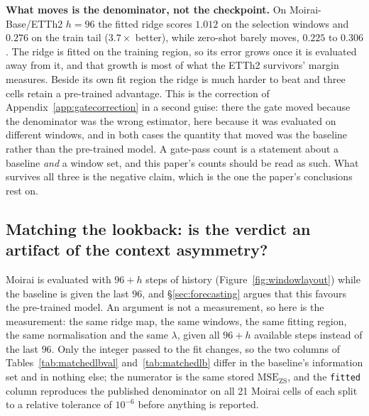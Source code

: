 \textbf{What moves is the denominator, not the checkpoint.}  On
Moirai-Base/ETTh2 $h{=}96$ the fitted ridge scores $1.012$ on the selection windows
and $0.276$ on the train tail ($3.7\times$ better), while zero-shot barely moves,
$0.225$ to $0.306$.  The ridge is fitted on the training region, so its error grows
once it is evaluated away from it, and that growth is most of what the ETTh2
survivors' margin measures.  Beside its own fit region the ridge is much harder to
beat and three cells retain a pre-trained advantage.  This is the correction of
Appendix~\ref{app:gatecorrection} in a second guise: there the gate moved because the
denominator was the wrong estimator, here because it was evaluated on different
windows, and in both cases the quantity that moved was the baseline rather than the
pre-trained model.  A gate-pass count is a statement about a baseline \emph{and} a
window set, and this paper's counts should be read as such.  What survives all three
is the negative claim, which is the one the paper's conclusions rest on.

\subsection{Matching the lookback: is the verdict an artifact of the context asymmetry?}
\label{app:baselines:matchedlb}

Moirai is evaluated with $96{+}h$ steps of history (Figure~\ref{fig:windowlayout})
while the baseline is given the last $96$, and \S\ref{sec:forecasting} argues that
this favours the pre-trained model.  An argument is not a measurement, so here is
the measurement: the same ridge map, the same windows, the same fitting region,
the same normalisation and the same $\lambda$, given all $96{+}h$ available steps
instead of the last $96$.  Only the integer passed to the fit changes, so the two
columns of Tables~\ref{tab:matchedlbval} and~\ref{tab:matchedlb} differ in the
baseline's information set and in nothing else; the numerator is the same stored
$\text{MSE}_\text{ZS}$, and the \texttt{fitted} column reproduces the published
denominator on all 21 Moirai cells of each split to a relative tolerance of
$10^{-6}$ before anything is reported.

